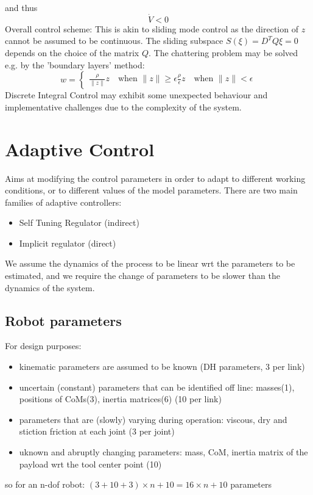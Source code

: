 \documentclass{book}
\begin{document}
and thus
\[
    \dot{V}<0
\]
Overall control scheme:
This is akin to sliding mode control as the direction of $z$ cannot be assumed to be continuous. The sliding subspace $S(\xi)=D^TQ\xi=0$ depends on the choice of the matrix $Q$. The chattering problem may be solved e.g. by the 'boundary layers' method:
\[
    w=\begin{cases}
        \displaystyle\frac{\rho}{\|z\|}z \quad \text{when }\|z\|\geq\epsilon
        \displaystyle\frac{\rho}{\epsilon}z \quad \text{when }\|z\|<\epsilon
    \end{cases}
\]
Discrete Integral Control may exhibit some unexpected behaviour and implementative challenges due to the complexity of the system. 


\section{Adaptive Control}
Aims at modifying the control parameters in order to adapt to different working conditions, or to different values of the model parameters.
There are two main families of adaptive controllers:
\begin{itemize}
    \item Self Tuning Regulator (indirect)
    \item Implicit regulator (direct)
\end{itemize}
We assume the dynamics of the process to be linear wrt the parameters to be estimated, and we require the change of parameters to be slower than the dynamics of the system. 
\subsection{Robot parameters}
For design purposes:
\begin{itemize}
    \item kinematic parameters are assumed to be known (DH parameters, 3 per link)
    \item uncertain (constant) parameters that can be identified off line: masses(1), positions of CoMs(3), inertia matrices(6) (10 per link)
    \item parameters that are (slowly) varying during operation: viscous, dry and stiction friction at each joint (3 per joint)
    \item uknown and abruptly changing parameters: mass, CoM, inertia matrix of the payload wrt the tool center point (10)
\end{itemize}
so for an n-dof robot: $(3+10+3)\times n +10=16\times n +10 $ parameters
\end{document}
